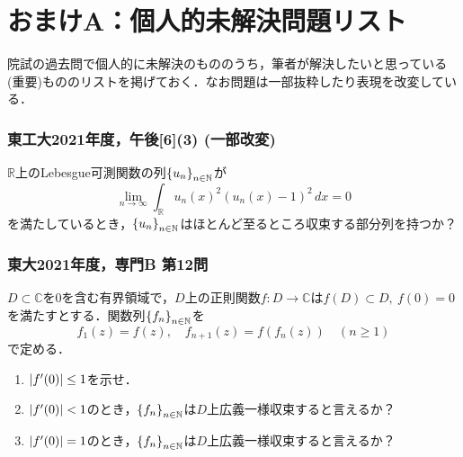\documentclass[a4j]{ltjsarticle}
\newcommand{\Rset}{\mathbb{R}}
\newcommand{\Nset}{\mathbb{N}}
\newcommand{\Cset}{\mathbb{C}}
\newcommand{\1}{\mathbbm{1}}
\numberwithin{equation}{section}
\theoremstyle{definition}
\begin{document}
\section{おまけA：個人的未解決問題リスト}
院試の過去問で個人的に未解決のもののうち，筆者が解決したいと思っている(重要)もののリストを掲げておく．なお問題は一部抜粋したり表現を改変している．

\subsubsection*{東工大2021年度，午後[6](3) (一部改変)}
$\Rset$上のLebesgue可測関数の列$\qty{u_n}_{n\in\Nset}$が
\begin{equation}
    \lim_{n\to\infty}\int_{\Rset}u_n(x)^2(u_n(x)-1)^2\,dx=0
\end{equation}
を満たしているとき，$\qty{u_n}_{n\in\Nset}$はほとんど至るところ収束する部分列を持つか？

\subsubsection*{東大2021年度，専門B 第12問}
$D\subset\Cset$を$0$を含む有界領域で，$D$上の正則関数$f\colon D\to\Cset$は$f(D)\subset D,\ f(0)=0$を満たすとする．関数列$\qty{f_n}_{n\in\Nset}$を
\begin{equation}
    f_1(z)=f(z),\quad f_{n+1}(z)=f(f_n(z))\quad (n\geq 1)
\end{equation}
で定める．
\begin{enumerate}
    \item $\abs{f'(0)}\leq 1$を示せ．
    \item $\abs{f'(0)}<1$のとき，$\qty{f_n}_{n\in\Nset}$は$D$上広義一様収束すると言えるか？
    \item $\abs{f'(0)}=1$のとき，$\qty{f_n}_{n\in\Nset}$は$D$上広義一様収束すると言えるか？
\end{enumerate}
\end{document}
